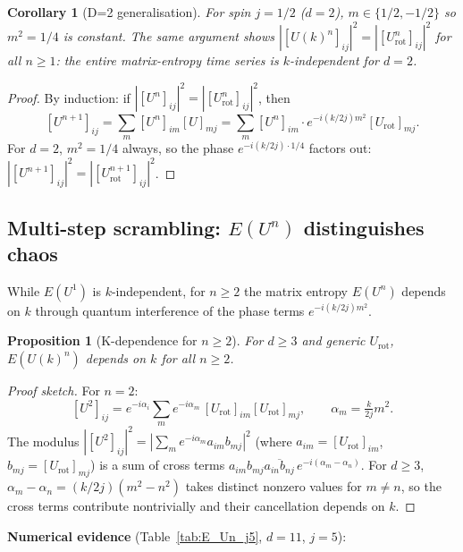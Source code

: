 \documentclass[12pt,a4paper]{article}
\newtheorem{proposition}[theorem]{Proposition}
\newtheorem{corollary}[theorem]{Corollary}
\begin{document}
\begin{corollary}[D=2 generalisation]
For spin $j = 1/2$ ($d=2$), $m \in \{1/2, -1/2\}$ so $m^2 = 1/4$ is
\emph{constant}.  The same argument shows $|[U(k)^n]_{ij}|^2 = |[U_{\mathrm{rot}}^n]_{ij}|^2$
for all $n\geq 1$: the entire matrix-entropy time series is $k$-independent for $d=2$.
\end{corollary}

\begin{proof}
By induction: if $|[U^n]_{ij}|^2 = |[U_{\mathrm{rot}}^n]_{ij}|^2$, then
\[
  [U^{n+1}]_{ij} = \sum_m [U^n]_{im}[U]_{mj}
  = \sum_m [U^n]_{im} \cdot e^{-i(k/2j)m^2}[U_{\mathrm{rot}}]_{mj}.
\]
For $d=2$, $m^2 = 1/4$ always, so the phase $e^{-i(k/2j)\cdot 1/4}$ factors out:
$|[U^{n+1}]_{ij}|^2 = |[U_{\mathrm{rot}}^{n+1}]_{ij}|^2$.
\end{proof}

\subsection{Multi-step scrambling: $E(U^n)$ distinguishes chaos}

While $E(U^1)$ is $k$-independent, for $n\geq 2$ the matrix entropy $E(U^n)$
depends on $k$ through quantum interference of the phase terms $e^{-i(k/2j)m^2}$.

\begin{proposition}[K-dependence for $n\geq 2$]\label{prop:k_dependent}
For $d\geq 3$ and generic $U_{\mathrm{rot}}$, $E(U(k)^n)$ depends on $k$ for
all $n\geq 2$.
\end{proposition}

\begin{proof}[Proof sketch]
For $n=2$:
\[
  [U^2]_{ij} = e^{-i\alpha_i}\sum_m e^{-i\alpha_m}\,[U_{\mathrm{rot}}]_{im}[U_{\mathrm{rot}}]_{mj},
  \qquad \alpha_m = \tfrac{k}{2j}m^2.
\]
The modulus $|[U^2]_{ij}|^2 = |\sum_m e^{-i\alpha_m} a_{im}b_{mj}|^2$ (where
$a_{im}=[U_{\mathrm{rot}}]_{im}$, $b_{mj}=[U_{\mathrm{rot}}]_{mj}$) is a sum of cross terms
$a_{im}b_{mj}\overline{a_{in}b_{nj}}\,e^{-i(\alpha_m-\alpha_n)}$.  For $d\geq 3$,
$\alpha_m - \alpha_n = (k/2j)(m^2-n^2)$ takes distinct nonzero values for
$m\neq n$, so the cross terms contribute nontrivially and their cancellation
depends on $k$.
\end{proof}

\textbf{Numerical evidence} (Table~\ref{tab:E_Un_j5}, $d=11$, $j=5$):
\end{document}
